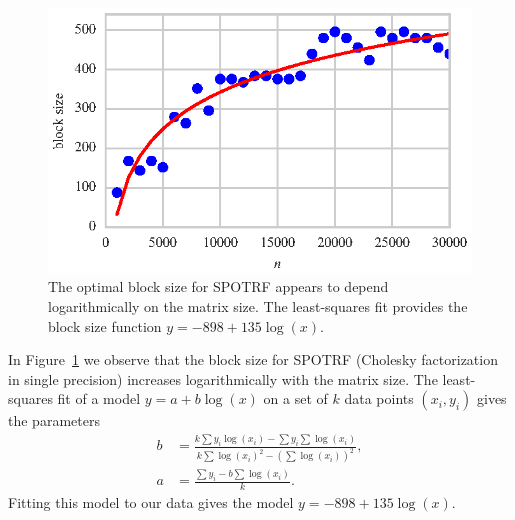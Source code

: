 \documentclass[a4paper,12pt]{article}
\begin{document}
\begin{figure}[ht]
  \centering
  \includegraphics[scale=1]{fig/curvefit_log.eps}
  \caption{The optimal block size for SPOTRF appears to depend
    logarithmically on the matrix size.
    The least-squares fit provides the block size function
    $y = -898 + 135\log(x)$.}
  \label{fig.fit_log}
\end{figure}
In Figure~\ref{fig.fit_log} we observe that the block size for
SPOTRF (Cholesky factorization in single precision)
increases logarithmically with the matrix size.
The least-squares fit of a model $y = a + b\log(x)$ on
a set of $k$ data points $(x_i, y_i)$ gives the parameters
\begin{align*}
  b &= \frac{k \sum y_i \log(x_i) - \sum y_i \sum \log(x_i)}
            {k \sum\log(x_i)^2 - (\sum \log(x_i))^2},\\
  a &= \frac{\sum y_i - b \sum\log(x_i)}{k}.
\end{align*}
Fitting this model to our data gives the model
$y = -898 + 135 \log(x)$.
\end{document}
